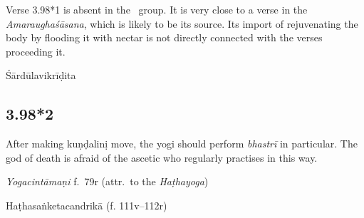 \begin{ekdosis}
\begin{testimonia}[hp03_098_1]
\end{testimonia}

\begin{philcomm}[hp03_098_1]
Verse 3.98*1 is absent in the \textalpha\ group. It is very close to a verse in the \textit{Amaraughaśāsana}, which is likely to be its source. Its import of rejuvenating the body by flooding it with nectar is not directly connected with the verses proceeding it. 

\end{philcomm}

\begin{metre}[hp03_098_1]
Śārdūlavikrīḍita
\end{metre}

\subsection*{3.98*2}
\begin{translation}[hp03_098_2]
After making kuṇḍalinị move, the yogi should perform \emph{bhastrī} in particular. The god of death is afraid of the ascetic who regularly practises in this way.
\end{translation}


\begin{testimonia}[hp03_098_2]
\emph{Yogacintāmaṇi} f.~79r (attr.~to the \emph{Haṭhayoga})
\begin{versinnote}
\end{versinnote}

Haṭhasaṅketacandrikā (f. 111v–112r)
\begin{versinnote}
\end{versinnote}
\end{testimonia}


\end{ekdosis}
